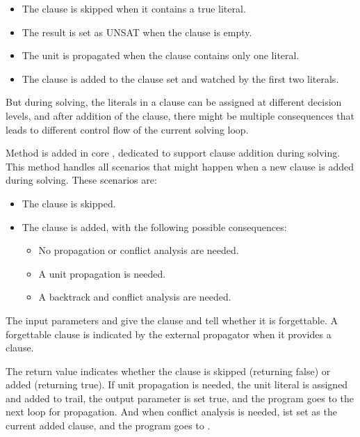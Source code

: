 \begin{itemize}
  \item The clause is skipped when it contains a true literal.
  \item The result is set as UNSAT when the clause is empty.
  \item The unit is propagated when the clause contains only one literal.
  \item The clause is added to the clause set and watched by the first two literals.
\end{itemize}

But during solving, the literals in a clause can be assigned at different decision levels, and after addition of the clause, there might be multiple consequences that leads to different control flow of the current solving loop.




Method  is added in core , dedicated to support clause addition during solving. This method handles all scenarios that might happen when a new clause is added during solving. These scenarios are:

\begin{itemize}
  \item The clause is skipped.
  \item The clause is added, with the following possible consequences:
    \begin{itemize}
      \item No propagation or conflict analysis are needed.
      \item A unit propagation is needed.
      \item A backtrack and conflict analysis are needed.
    \end{itemize}
\end{itemize}

The input parameters  and  give the clause and tell whether it is forgettable. A forgettable clause is indicated by the external propagator when it provides a clause.

The return value  indicates whether the clause is skipped (returning false) or added (returning true). If unit propagation is needed, the unit literal is assigned and added to trail, the output parameter  is set true, and the program goes to the next loop for propagation. And when conflict analysis is needed,  ist set as the current added clause, and the program goes to .

